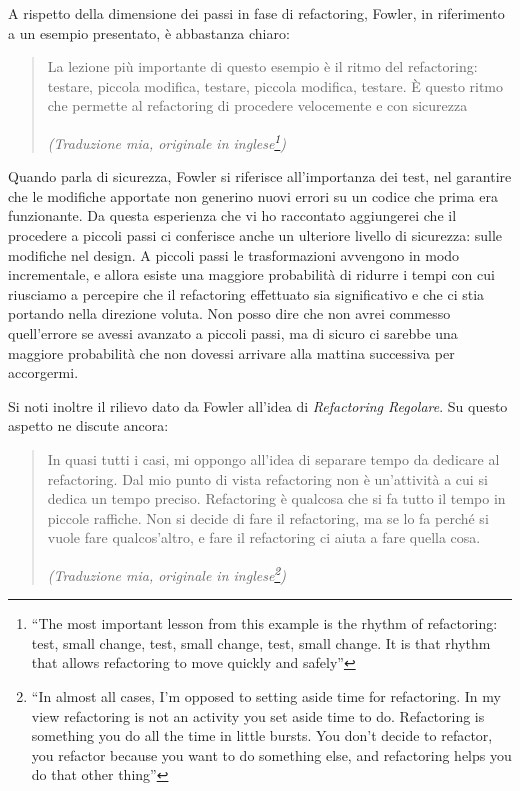 \documentclass[12pt]{report}
\begin{document}
A rispetto della dimensione dei passi in fase di refactoring, Fowler, in
riferimento a un esempio presentato, è abbastanza chiaro:

\begin{quote}
La lezione più importante di questo esempio è il ritmo del refactoring:
testare, piccola modifica, testare, piccola modifica, testare. È questo
ritmo che permette al refactoring di procedere velocemente
e con sicurezza\cite{fowler2002}

\flushright\textit{(Traduzione mia, originale in inglese\footnote{
``The most important lesson from this example is the rhythm of refactoring:
test, small change, test, small change, test, small change. It is that
rhythm that allows refactoring to move quickly and safely''
})
}
\end{quote}

Quando parla di sicurezza, Fowler si riferisce all'importanza dei test,
nel garantire che le modifiche apportate non generino nuovi errori
su un codice che prima era funzionante. Da questa esperienza che vi ho
raccontato aggiungerei che il procedere a piccoli passi ci conferisce
anche un ulteriore livello di sicurezza: sulle modifiche nel design. 
A piccoli passi le trasformazioni avvengono in modo incrementale,
e allora esiste una maggiore probabilità di ridurre i tempi con cui 
riusciamo a percepire che il refactoring effettuato sia significativo 
e che ci stia portando nella direzione voluta.
Non posso dire che non avrei commesso quell'errore se avessi avanzato
a piccoli passi, ma di sicuro ci sarebbe una maggiore probabilità che
non dovessi arrivare alla mattina successiva per accorgermi.

Si noti inoltre il rilievo dato da Fowler all'idea di 
\textit{Refactoring Regolare}. Su questo aspetto ne discute
ancora:

\begin{quote}
In quasi tutti i casi, mi oppongo all'idea di separare tempo da dedicare
al refactoring. Dal mio punto di vista refactoring non è un'attività a cui
si dedica un tempo preciso. Refactoring è qualcosa che si fa tutto il tempo
in piccole raffiche. Non si decide di fare il refactoring, ma se lo fa
perché si vuole fare qualcos'altro, e fare il refactoring ci aiuta a 
fare quella cosa\cite{fowler2002}.

\flushright
\textit{(Traduzione mia, originale in inglese\footnote{
``In almost all cases, I'm opposed to setting aside time for refactoring.
In my view refactoring is not an activity you set aside time to do.
Refactoring is something you do all the time in little bursts. You don't
decide to refactor, you refactor because you want to do something else,
and refactoring helps you do that other thing''
})
}
\end{quote}
\end{document}
